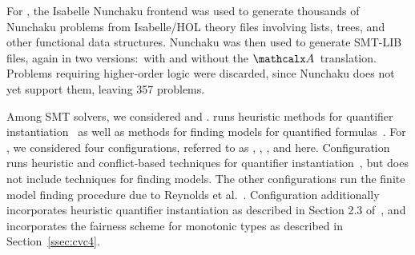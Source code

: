 For \isanun, the Isabelle Nunchaku frontend was used to generate thousands of
Nunchaku problems from Isabelle/HOL theory files involving lists, trees, and
other functional data structures. Nunchaku was then used to generate SMT-LIB
files, again in two versions:\ with and without the $\conv$~translation.
Problems requiring higher-order logic were discarded, since Nunchaku does not
yet support them, leaving 357 problems.





Among SMT solvers, we considered \ziii and \cvc.
\ziii runs heuristic methods for quantifier instantiation~\cite{MouraBjoerner07}
as well as methods for finding models for quantified formulas~\cite{GeDeM-CAV-09}.
For \cvc, we considered four configurations, referred
to as \cvcd, \cvcf, \cvcfe, and \cvcfm here.
Configuration \cvcd runs heuristic
and conflict-based techniques for quantifier instantiation~\cite{ReynoldsTinelliMoura14},
but does not include techniques for finding models.
The other configurations run the finite model
finding procedure due to Reynolds et al.\ \cite{ReyEtAl-1-RR-13,reynolds-et-al-2013}.
Configuration \cvcfe additionally incorporates heuristic quantifier instantiation as described in Section 2.3 of~\cite{reynolds-et-al-2013},
and \cvcfm incorporates the fairness scheme for monotonic types as described in Section~\ref{ssec:cvc4}.

